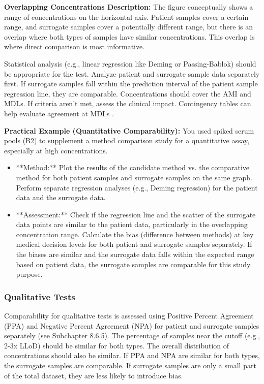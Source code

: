 \documentclass{article}
\begin{document}
\textbf{Overlapping Concentrations Description:} The figure conceptually shows a range of concentrations on the horizontal axis. Patient samples cover a certain range, and surrogate samples cover a potentially different range, but there is an overlap where both types of samples have similar concentrations. This overlap is where direct comparison is most informative.

Statistical analysis (e.g., linear regression like Deming or Passing-Bablok) should be appropriate for the test. Analyze patient and surrogate sample data separately first. If surrogate samples fall within the prediction interval of the patient sample regression line, they are comparable. Concentrations should cover the AMI and MDLs. If criteria aren't met, assess the clinical impact. Contingency tables can help evaluate agreement at MDLs \cite{CLSIEP12, CLSIMM17}.

\textbf{Practical Example (Quantitative Comparability):}
You used spiked serum pools (B2) to supplement a method comparison study for a quantitative assay, especially at high concentrations.
\begin{itemize}
    \item **Method:** Plot the results of the candidate method vs. the comparative method for both patient samples and surrogate samples on the same graph. Perform separate regression analyses (e.g., Deming regression) for the patient data and the surrogate data.
    \item **Assessment:** Check if the regression line and the scatter of the surrogate data points are similar to the patient data, particularly in the overlapping concentration range. Calculate the bias (difference between methods) at key medical decision levels for both patient and surrogate samples separately. If the biases are similar and the surrogate data falls within the expected range based on patient data, the surrogate samples are comparable for this study purpose.
\end{itemize}

\subsubsection{Qualitative Tests}

Comparability for qualitative tests is assessed using Positive Percent Agreement (PPA) and Negative Percent Agreement (NPA) for patient and surrogate samples separately (see Subchapter 8.6.5). The percentage of samples near the cutoff (e.g., 2-3x LLoD) should be similar for both types. The overall distribution of concentrations should also be similar. If PPA and NPA are similar for both types, the surrogate samples are comparable. If surrogate samples are only a small part of the total dataset, they are less likely to introduce bias.
\end{document}
